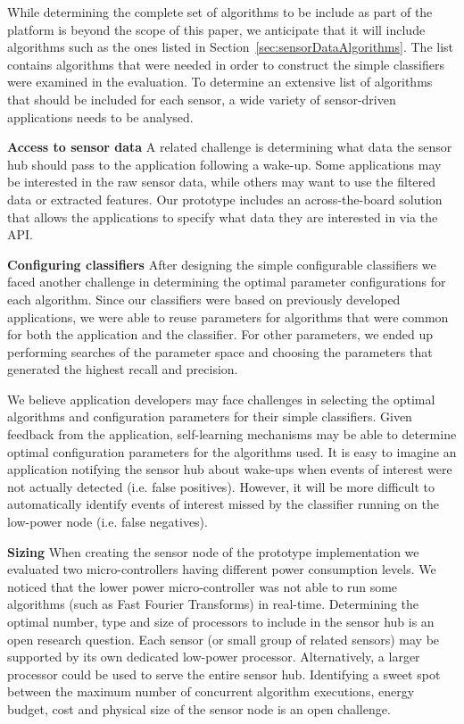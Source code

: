 While determining the complete set of 
algorithms to be include as part of the platform is beyond the
scope of this paper, we anticipate that it will include algorithms 
such as the ones listed in Section~\ref{sec:sensorDataAlgorithms}.
The list contains algorithms that were needed in order to construct
the simple classifiers were examined in the evaluation.  To 
determine an extensive list of 
algorithms that should be included for each sensor, a wide variety
of sensor-driven applications needs to be analysed.


{\bf Access to sensor data} A related challenge is determining what
data the sensor hub should pass to the application following a
wake-up.  Some applications may be interested in the raw sensor data,
while others may want to use the filtered data or extracted features.
Our prototype includes an across-the-board solution that allows the 
applications to specify what data they are interested in via the API.


{\bf Configuring classifiers} After designing the simple 
configurable classifiers we faced another challenge in determining 
the optimal parameter configurations for each algorithm.  Since our
classifiers were based on previously developed applications, we were
able to reuse parameters for algorithms that were common for both the
application and the classifier.  For other parameters, we ended up
performing searches of the parameter space and choosing the parameters
that generated the highest recall and precision.

We believe application developers may
face challenges in selecting the optimal algorithms and configuration
parameters for their simple classifiers.  Given feedback from the
application, self-learning mechanisms may be able to determine optimal
configuration parameters for the algorithms used.  It is easy to 
imagine an application notifying the
sensor hub about wake-ups when events of interest were not actually
detected (i.e. false positives).  However, it will be more difficult
to automatically identify events of interest missed by the classifier
running on the low-power node (i.e. false negatives).

{\bf Sizing} When creating the sensor node of the prototype 
implementation we evaluated two micro-controllers having 
different power consumption levels.  We noticed that the lower 
power micro-controller was not able to run some algorithms (such
as Fast Fourier Transforms) in real-time. Determining the optimal 
number, type and size of
processors to include in the sensor hub is an open research question.
Each sensor (or small group of related sensors) may be supported by
its own dedicated low-power processor.  Alternatively, a larger
processor could be used to serve the entire sensor hub.  Identifying a
sweet spot between the maximum number of concurrent algorithm
executions, energy budget, cost and physical size of the sensor node
is an open challenge.


